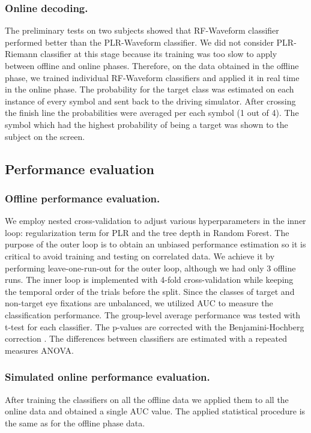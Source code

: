 \documentclass[12pt]{iopart}
\begin{document}
\subsubsection*{Online decoding.}
The preliminary tests on two subjects showed that RF-Waveform classifier
performed better than the PLR-Waveform classifier. We did not consider
PLR-Riemann classifier at this stage because its training
was too slow to apply between offline and online phases.
Therefore, on the data obtained in the offline phase, we trained individual RF-Waveform classifiers
and applied it in real time in the online phase.
The probability for the target class was
estimated on each instance of every symbol and sent
back to the driving simulator. After crossing the finish line
the probabilities were averaged per each symbol (1 out of 4).
The symbol which had the highest probability of being a target was
shown to the subject on the screen.


\subsection{Performance evaluation}

\subsubsection*{Offline performance evaluation.}
We employ nested cross-validation to adjust various hyperparameters in the inner loop:
regularization term for PLR and the tree depth in Random Forest.
The purpose of the outer loop is to obtain an unbiased performance estimation
so it is critical to avoid training and testing on correlated data.
We achieve it by performing leave-one-run-out for the outer loop,
although we had only 3 offline runs.
The inner loop is implemented with 4-fold cross-validation while keeping
the temporal order of the trials before the split.
Since the classes of target and non-target eye fixations are unbalanced,
we utilized AUC to measure the classification performance.
The group-level average performance was tested with t-test for each classifier.
The p-values are corrected with 
the Benjamini-Hochberg correction \cite{benjamini_controlling_1995}.
The differences between classifiers are estimated with a repeated measures ANOVA.

\subsubsection*{Simulated online performance evaluation.}
After training the classifiers on all the offline data we applied them 
to all the online data and obtained a single AUC value.
The applied statistical procedure is the same as for the offline phase data.
\end{document}
